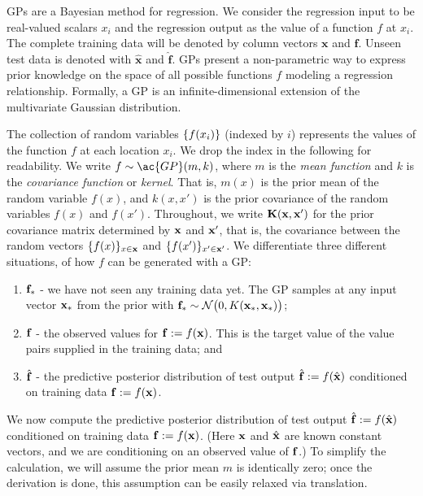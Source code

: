 \ac{GP}s are a Bayesian method for regression. We consider the regression input to be real-valued scalars $x_i$ and the regression output as the value of a function $f$ at $x_i$. The complete training data will be denoted by column vectors $\mathbf{x}$ and $\mathbf{f}$. Unseen test data is denoted with $\mathbf{\hat{x}}$ and $\mathbf{\hat{f}}$.
\ac{GP}s present a non-parametric way to express prior knowledge on the space of all possible functions $f$ modeling
a regression relationship.
Formally, a GP is an infinite-dimensional extension of the multivariate Gaussian distribution.

The collection of random variables $\left\{ f(x_i) \right\}$ (indexed by $i$) represents the
values of the function $f$ at each location $x_i$.
We drop the index in the following for readability.
We write $f \sim \ac{GP}(m,k)$, where $m$ is the {\em mean function} and $k$ is the {\em covariance function} or {\em kernel}.
That is, $m(x)$ is the prior mean of the random variable $f(x)$, and $k(x,x')$ is the prior covariance of the random variables $f(x)$ and $f(x')$.
Throughout, we write $\mathbf{K}(\mathbf{x},\mathbf{x}^\prime)$ for the prior covariance matrix determined by $\mathbf{x}$ and $\mathbf{x}^\prime$, that is, the covariance between the random vectors $\{f(x)\}_{x \in \mathbf{x}}$ and $\{f(x')\}_{x' \in \mathbf{x}'}$.
We differentiate three different situations, of how  $f$ can be generated with a \ac{GP}:
\begin{enumerate}
\item $\mathbf{f}_*$ - we have not seen any training data yet.
    The \ac{GP} samples at any input vector $\mathbf{x}_*$ from the prior with
     $\mathbf{f}_* \sim \mathcal{N}\big(0,K(\mathbf{x}_*,\mathbf{x}_*)\big)$;
\item $\mathbf{f}$ - the observed values for $\mathbf{f}:=f(\mathbf{x})$. This is the target value of the value pairs supplied in 
the training data; and
\item $\hat{\mathbf{f}}$ - the predictive posterior distribution of test output $\hat{\mathbf{f}} := f(\hat{\mathbf{x}})$ conditioned on training data $\mathbf{f} := f(\mathbf{x})$.
\end{enumerate}We now compute the predictive posterior distribution of test output $\hat{\mathbf{f}} := f(\hat{\mathbf{x}})$ conditioned on training data $\mathbf{f} := f(\mathbf{x})$.  (Here $\mathbf{x}$ and $\hat{\mathbf{x}}$ are known constant vectors, and we are conditioning on an observed value of $\mathbf{f}$.)  To simplify the calculation, we will assume the prior mean $m$ is identically zero; once the derivation is done, this assumption can be easily relaxed via translation.

